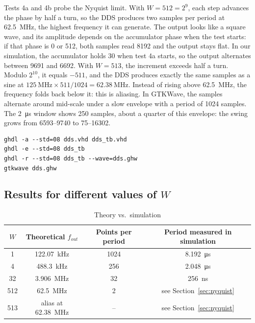 \documentclass[11pt,a4paper]{article}
\renewcommand{\_}{\oldunderscore\allowbreak}
\begin{document}
Tests 4a and 4b probe the Nyquist limit. With $W = 512 = 2^9$, each step advances
the phase by half a turn, so the DDS produces two samples per period at
\SI{62.5}{\mega\hertz}, the highest frequency it can generate. The output looks like
a square wave, and its amplitude depends on the accumulator phase when the test
starts: if that phase is 0 or 512, both samples read 8192 and the output stays
flat. In our simulation, the accumulator holds 30 when test 4a starts, so the
output alternates between 9691 and 6692. With $W = 513$, the increment exceeds half
a turn. Modulo $2^{10}$, it equals $-511$, and the DDS produces exactly the same
samples as a sine at $\SI{125}{\mega\hertz} \times 511 / 1024 =
\SI{62.38}{\mega\hertz}$. Instead of rising above \SI{62.5}{\mega\hertz}, the
frequency folds back below it: this is aliasing. In GTKWave, the samples alternate
around mid-scale under a slow envelope with a period of 1024 samples. The
\SI{2}{\micro\second} window shows 250 samples, about a quarter of this envelope:
the swing grows from 6593--9740 to 75--16302.

\begin{lstlisting}[style=sh, caption={Simulation commands}]
ghdl -a --std=08 dds.vhd dds_tb.vhd
ghdl -e --std=08 dds_tb
ghdl -r --std=08 dds_tb --wave=dds.ghw
gtkwave dds.ghw
\end{lstlisting}

\subsection{Results for different values of $W$}

\begin{table}[H]
\centering
\begin{tabular}{cccc}
\toprule
$W$ & Theoretical $f_{out}$ & Points per period & Period measured in simulation \\
\midrule
1   & \SI{122.07}{\kilo\hertz} & 1024 & \SI{8.192}{\micro\second} \\
4   & \SI{488.3}{\kilo\hertz}  & 256  & \SI{2.048}{\micro\second} \\
32  & \SI{3.906}{\mega\hertz}  & 32   & \SI{256}{\nano\second} \\
512 & \SI{62.5}{\mega\hertz}   & 2    & see Section~\ref{sec:nyquist} \\
513 & alias at \SI{62.38}{\mega\hertz} & -- & see Section~\ref{sec:nyquist} \\
\bottomrule
\end{tabular}
\caption{Theory vs.\ simulation}\label{tab:sim}
\end{table}
\end{document}
